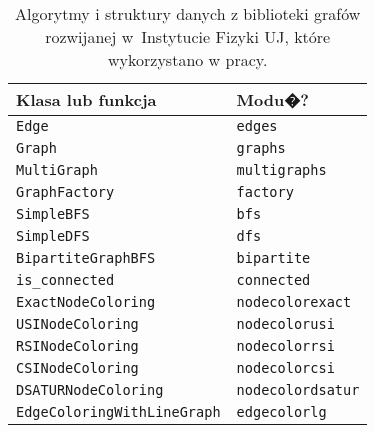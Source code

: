 \documentclass[12pt,a4paper]{mwrep}
\begin{document}
\begin{table}
\centering
\caption[Algorytmy i struktury danych z biblioteki grafów IF UJ.]{
Algorytmy i struktury danych z biblioteki grafów rozwijanej 
w~Instytucie Fizyki UJ, które wykorzystano w pracy.
\label{tab:algorytmy_ifuj}}
\begin{tabular}{|l|l|}
\hline 
\textbf{Klasa lub funkcja}   & \textbf{Modu�?}  \\
\hline 
\lstinline|Edge|  &  \lstinline|edges|  \\
\hline 
\lstinline|Graph|  &  \lstinline|graphs|  \\
\hline 
\lstinline|MultiGraph|  &  \lstinline|multigraphs|  \\
\hline 
\lstinline|GraphFactory|  &  \lstinline|factory|  \\
\hline 
\lstinline|SimpleBFS|  &  \lstinline|bfs|  \\
\hline 
\lstinline|SimpleDFS|  &  \lstinline|dfs|  \\
\hline 
\lstinline|BipartiteGraphBFS|  &  \lstinline|bipartite|  \\
\hline 
\lstinline|is_connected|  &  \lstinline|connected|  \\
\hline 
\lstinline|ExactNodeColoring|  &  \lstinline|nodecolorexact|  \\
\hline 
\lstinline|USINodeColoring|  &  \lstinline|nodecolorusi|  \\
\hline 
\lstinline|RSINodeColoring|  &  \lstinline|nodecolorrsi|  \\
\hline 
\lstinline|CSINodeColoring|  &  \lstinline|nodecolorcsi|  \\
\hline 
\lstinline|DSATURNodeColoring|  &  \lstinline|nodecolordsatur|  \\
\hline 
\lstinline|EdgeColoringWithLineGraph| &  \lstinline|edgecolorlg| \\
\hline 
\end{tabular}
\end{table}
\end{document}
